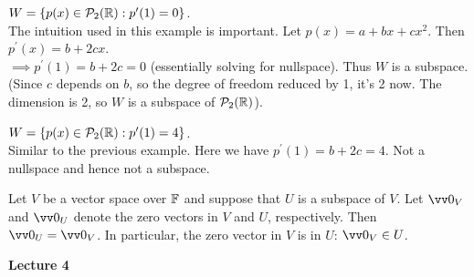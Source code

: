 \begin{example}
    $W = \left\{  p(x) \in \mathcal{P}_2({\mathbb{R}}): p^\prime(1) = 0 \right\}$. \\
    The intuition used in this example is important. Let $p(x) = a + bx + cx^2$. Then $p^\prime(x) = b + 2cx$. \\
    $\implies p^\prime(1) = b + 2c = 0$ (essentially solving for nullspace). Thus $W$ is a subspace. \\
    (Since $c$ depends on $b$, so the degree of freedom reduced by 1, it's 2 now. The dimension is 2, so $W$ is a subspace of $\mathcal{P}_2({\mathbb{R}})$).
\end{example}

\begin{example}
    $W = \left\{  p(x) \in \mathcal{P}_2({\mathbb{R}}): p^\prime (1) = 4 \right\}$. \\
    Similar to the previous example. Here we have $p^\prime(1) = b + 2c = 4$. Not a nullspace and hence not a subspace.
\end{example}

\begin{corollary}
    Let $V$ be a vector space over ${\mathbb{F}}$ and suppose that $U$ is a subspace of $V$. Let $\vzero_V$ and $\vzero_U$ denote the
    zero vectors in $V$ and $U$, respectively. Then $\vzero_U = \vzero_V$. In particular, the zero vector in $V$ is in $U$: $\vzero_V \in U$.
\end{corollary}


\makebox[\linewidth]{\hrulefill}
{\large \textbf{Lecture 4}}

